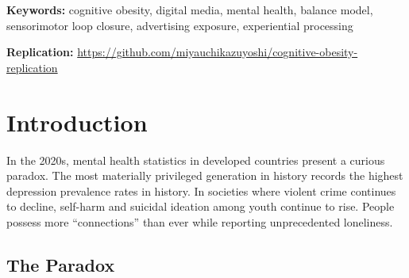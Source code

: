 \documentclass[a4paper,11pt,titlepage]{article}
\begin{document}
\begin{abstract}
Individual-level verification (NHANES $N=5{,}032$ with complex survey weights; ATUS $N=21{,}736$) confirms that physical exercise and active cognitive leisure independently predict wellbeing as additive channels (interaction $p=0.95$; Cohen's $d=0.30$ for exercise).
Structural balance estimation directly tests the additive model: Internet ($\hat{\alpha}_1>0$, $t=5.05$) and education ($\hat{\alpha}_2$, $t=6.75$) enter as separable predictors under TWFE, with the additive specification preferred over a ratio model ($\Delta\text{AIC}=72$).
Existing findings from behavioral economics, environmental psychology, and neuroscience are reinterpreted through the balance model as convergent evidence.

Critical limitation: all macro-level findings are subject to ecological fallacy---country-level associations cannot be directly attributed to individual-level mechanisms.
This study is exploratory and requires individual-level confirmatory verification via Experience Sampling Method (ESM). Falsification conditions are explicitly stated.
\end{abstract}

\vspace{1em}
\noindent\textbf{Keywords:} cognitive obesity, digital media, mental health, balance model, sensorimotor loop closure, advertising exposure, experiential processing

\noindent\textbf{Replication:} \url{https://github.com/miyauchikazuyoshi/cognitive-obesity-replication}

\newpage
\tableofcontents
\newpage

\section{Introduction}\label{sec:introduction}

In the 2020s, mental health statistics in developed countries present a curious paradox. The most materially privileged generation in history records the highest depression prevalence rates in history. In societies where violent crime continues to decline, self-harm and suicidal ideation among youth continue to rise. People possess more ``connections'' than ever while reporting unprecedented loneliness.

\subsection{The Paradox}
\end{document}
